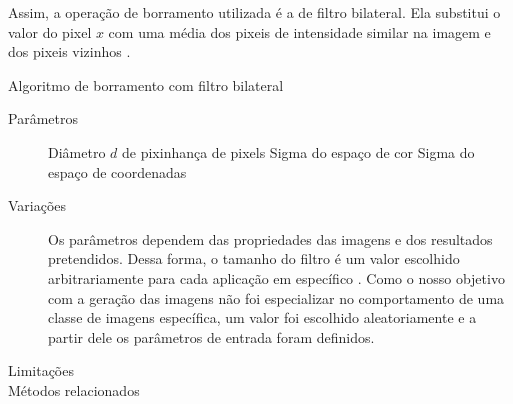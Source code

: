 Assim, a operação de borramento utilizada é a de filtro bilateral. Ela substitui
o valor do pixel $x$ com uma média dos pixeis de intensidade similar na imagem e dos pixeis
vizinhos \cite{Tomasi1998}.

\vspace{0.5cm}
\begin{algorithm}[H]
  \caption{Algoritmo de borramento com filtro bilateral}
  \label{alg:blur}
  \SetAlgoLined

\end{algorithm}
\vspace{0.5cm}

\begin{description}
  \item[Parâmetros] Diâmetro $d$ de pixinhança de pixels
Sigma do espaço de cor
Sigma do espaço de coordenadas

\item[Variações]
Os parâmetros dependem das propriedades das imagens e dos resultados pretendidos.
Dessa forma, o tamanho do filtro é um valor escolhido arbitrariamente para cada
aplicação em específico \cite{Tomasi1998}. Como o nosso objetivo com a geração das
imagens não foi especializar no comportamento de uma classe de imagens específica,
um valor foi escolhido aleatoriamente e a partir dele os parâmetros de entrada
foram definidos.


\item[Limitações]
\item[Métodos relacionados]
\end{description}
